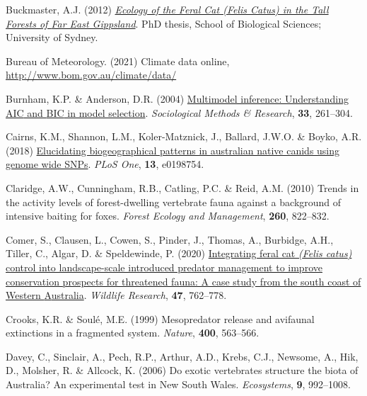 \documentclass[preprint, 3p, authoryear]{elsarticle} %
\newlength{\cslhangindent}
\newlength{\cslentryspacingunit} %
\newenvironment{CSLReferences}[2] %
 {%
  \setlength{\parindent}{0pt}
  \ifodd #1
  \let\oldpar\par
  \def\par{\hangindent=\cslhangindent\oldpar}
  \fi
  \setlength{\parskip}{#2\cslentryspacingunit}
 }%
 {}
\begin{document}
\begin{CSLReferences}{1}{0}
\leavevmode{}%
Buckmaster, A.J. (2012) \emph{\href{http://hdl.handle.net/2123/8123}{Ecology of the Feral Cat (Felis Catus) in the Tall Forests of {Far East Gippsland}}}. PhD thesis, School of Biological Sciences; University of Sydney.

\leavevmode{}%
Bureau of Meteorology. (2021) Climate data online, \url{http://www.bom.gov.au/climate/data/}

\leavevmode{}%
Burnham, K.P. \& Anderson, D.R. (2004) \href{https://doi.org/10.1177/0049124104268644}{Multimodel inference: Understanding {AIC} and {BIC} in model selection}. \emph{Sociological Methods \& Research}, \textbf{33}, 261--304.

\leavevmode{}%
Cairns, K.M., Shannon, L.M., Koler-Matznick, J., Ballard, J.W.O. \& Boyko, A.R. (2018) \href{https://doi.org/10.1371/journal.pone.0198754}{Elucidating biogeographical patterns in australian native canids using genome wide SNPs}. \emph{PLoS One}, \textbf{13}, e0198754.

\leavevmode{}%
Claridge, A.W., Cunningham, R.B., Catling, P.C. \& Reid, A.M. (2010) Trends in the activity levels of forest-dwelling vertebrate fauna against a background of intensive baiting for foxes. \emph{Forest Ecology and Management}, \textbf{260}, 822--832.

\leavevmode{}%
Comer, S., Clausen, L., Cowen, S., Pinder, J., Thomas, A., Burbidge, A.H., Tiller, C., Algar, D. \& Speldewinde, P. (2020) \href{https://doi.org/10.1071/WR19217}{Integrating feral cat \emph{({Felis catus})} control into landscape-scale introduced predator management to improve conservation prospects for threatened fauna: A case study from the south coast of {Western {A}ustralia}}. \emph{Wildlife Research}, \textbf{47}, 762--778.

\leavevmode{}%
Crooks, K.R. \& Soulé, M.E. (1999) Mesopredator release and avifaunal extinctions in a fragmented system. \emph{Nature}, \textbf{400}, 563--566.

\leavevmode{}%
Davey, C., Sinclair, A., Pech, R.P., Arthur, A.D., Krebs, C.J., Newsome, A., Hik, D., Molsher, R. \& Allcock, K. (2006) Do exotic vertebrates structure the biota of {{A}ustralia}? An experimental test in {New South Wales}. \emph{Ecosystems}, \textbf{9}, 992--1008.


\end{CSLReferences}
\end{document}
